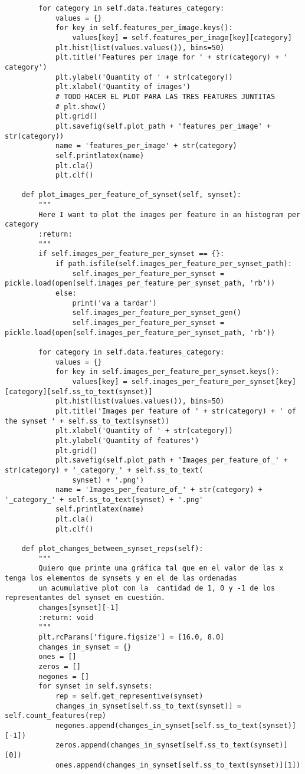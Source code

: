 \documentclass[12,twoside]{TFG-GM}
\theoremstyle{definition}
\theoremstyle{remark}
\begin{document}
\begin{verbatim}
        for category in self.data.features_category:
            values = {}
            for key in self.features_per_image.keys():
                values[key] = self.features_per_image[key][category]
            plt.hist(list(values.values()), bins=50)
            plt.title('Features per image for ' + str(category) + ' category')
            plt.ylabel('Quantity of ' + str(category))
            plt.xlabel('Quantity of images')
            # TODO HACER EL PLOT PARA LAS TRES FEATURES JUNTITAS
            # plt.show()
            plt.grid()
            plt.savefig(self.plot_path + 'features_per_image' + str(category))
            name = 'features_per_image' + str(category)
            self.printlatex(name)
            plt.cla()
            plt.clf()

    def plot_images_per_feature_of_synset(self, synset):
        """
        Here I want to plot the images per feature in an histogram per category
        :return:
        """
        if self.images_per_feature_per_synset == {}:
            if path.isfile(self.images_per_feature_per_synset_path):
                self.images_per_feature_per_synset = pickle.load(open(self.images_per_feature_per_synset_path, 'rb'))
            else:
                print('va a tardar')
                self.images_per_feature_per_synset_gen()
                self.images_per_feature_per_synset = pickle.load(open(self.images_per_feature_per_synset_path, 'rb'))

        for category in self.data.features_category:
            values = {}
            for key in self.images_per_feature_per_synset.keys():
                values[key] = self.images_per_feature_per_synset[key][category][self.ss_to_text(synset)]
            plt.hist(list(values.values()), bins=50)
            plt.title('Images per feature of ' + str(category) + ' of the synset ' + self.ss_to_text(synset))
            plt.xlabel('Quantity of ' + str(category))
            plt.ylabel('Quantity of features')
            plt.grid()
            plt.savefig(self.plot_path + 'Images_per_feature_of_' + str(category) + '_category_' + self.ss_to_text(
                synset) + '.png')
            name = 'Images_per_feature_of_' + str(category) + '_category_' + self.ss_to_text(synset) + '.png'
            self.printlatex(name)
            plt.cla()
            plt.clf()

    def plot_changes_between_synset_reps(self):
        """
        Quiero que printe una gráfica tal que en el valor de las x tenga los elementos de synsets y en el de las ordenadas
        un acumulative plot con la  cantidad de 1, 0 y -1 de los representantes del synset en cuestión.
        changes[synset][-1]
        :return: void
        """
        plt.rcParams['figure.figsize'] = [16.0, 8.0]
        changes_in_synset = {}
        ones = []
        zeros = []
        negones = []
        for synset in self.synsets:
            rep = self.get_representive(synset)
            changes_in_synset[self.ss_to_text(synset)] = self.count_features(rep)
            negones.append(changes_in_synset[self.ss_to_text(synset)][-1])
            zeros.append(changes_in_synset[self.ss_to_text(synset)][0])
            ones.append(changes_in_synset[self.ss_to_text(synset)][1])


\end{verbatim}
\end{document}

